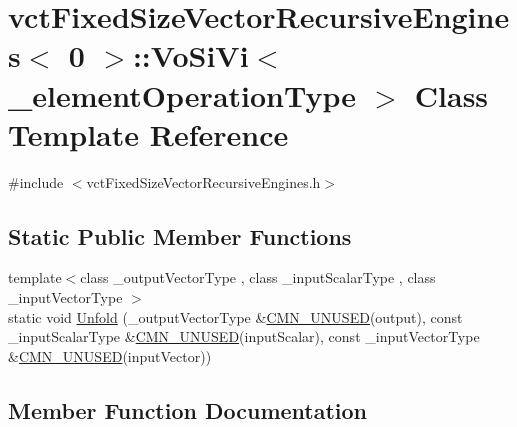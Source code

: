 \hypertarget{classvct_fixed_size_vector_recursive_engines_3_010_01_4_1_1_vo_si_vi}{}\section{vct\+Fixed\+Size\+Vector\+Recursive\+Engines$<$ 0 $>$\+:\+:Vo\+Si\+Vi$<$ \+\_\+element\+Operation\+Type $>$ Class Template Reference}
\label{classvct_fixed_size_vector_recursive_engines_3_010_01_4_1_1_vo_si_vi}


{\ttfamily \#include $<$vct\+Fixed\+Size\+Vector\+Recursive\+Engines.\+h$>$}

\subsection*{Static Public Member Functions}
\begin{DoxyCompactItemize}
\item 
{\footnotesize template$<$class \+\_\+output\+Vector\+Type , class \+\_\+input\+Scalar\+Type , class \+\_\+input\+Vector\+Type $>$ }\\static void \hyperlink{classvct_fixed_size_vector_recursive_engines_3_010_01_4_1_1_vo_si_vi_a9d2c5c299494a7541dc7cf04645f025c}{Unfold} (\+\_\+output\+Vector\+Type \&\hyperlink{cmn_portability_8h_a021894e2626935fa2305434b1e893ff6}{C\+M\+N\+\_\+\+U\+N\+U\+S\+E\+D}(output), const \+\_\+input\+Scalar\+Type \&\hyperlink{cmn_portability_8h_a021894e2626935fa2305434b1e893ff6}{C\+M\+N\+\_\+\+U\+N\+U\+S\+E\+D}(input\+Scalar), const \+\_\+input\+Vector\+Type \&\hyperlink{cmn_portability_8h_a021894e2626935fa2305434b1e893ff6}{C\+M\+N\+\_\+\+U\+N\+U\+S\+E\+D}(input\+Vector))
\end{DoxyCompactItemize}


\subsection{Member Function Documentation}
\hypertarget{classvct_fixed_size_vector_recursive_engines_3_010_01_4_1_1_vo_si_vi_a9d2c5c299494a7541dc7cf04645f025c}{}
